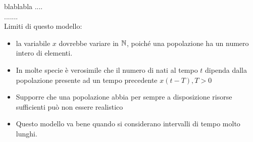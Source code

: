 blablabla ....\\
.......\\
Limiti di questo modello:
\begin{itemize}
	\item la variabile $x$ dovrebbe variare in $\mathbb{N}$, poiché una popolazione ha un numero intero di elementi.
	\item In molte specie è verosimile che il numero di nati al tempo $t$ dipenda dalla popolazione presente ad un tempo precedente $x(t-T), T>0$
	\item Supporre che una popolazione abbia per sempre a disposizione risorse sufficienti può non essere realistico
	\item Questo modello va bene quando si considerano intervalli di tempo molto lunghi.
\end{itemize}